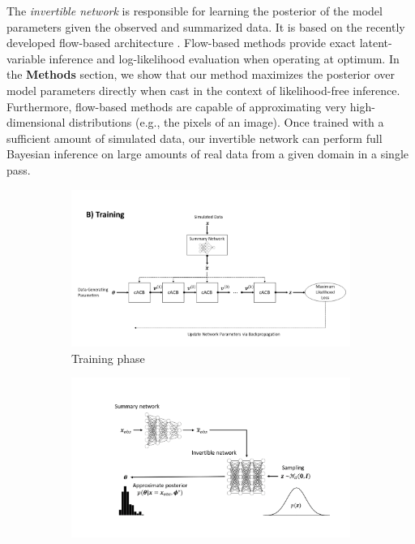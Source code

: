 \documentclass[9pt,twoside,lineno]{pnas-new}
\begin{document}
The \textit{invertible network} is responsible for learning the posterior of the model parameters given the observed and summarized data. It is based on the recently developed flow-based architecture \cite{kingma2018glow, grover2018flow, dinh2016density}. Flow-based methods provide exact latent-variable inference and log-likelihood evaluation when operating at optimum. In the \textbf{Methods} section, we show that our method maximizes the posterior over model parameters directly when cast in the context of likelihood-free inference. Furthermore, flow-based methods are capable of approximating very high-dimensional distributions (e.g., the pixels of an image). Once trained with a sufficient amount of simulated data, our invertible network can perform full Bayesian inference on large amounts of real data from a given domain in a single pass. 
\begin{figure}
  \begin{subfigure}[b]{1.0\textwidth}
    \includegraphics[width=\textwidth]{training.png}
    \caption{Training phase}
    \label{fig:Fig.1a}
  \end{subfigure}
  \begin{subfigure}[b]{1.0\textwidth}
    \includegraphics[width=\textwidth]{inference.png}

\end{subfigure}
\end{figure}
\end{document}
